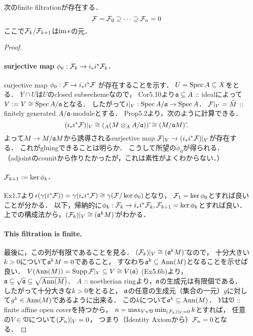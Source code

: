 \documentclass[a4paper]{jsarticle}
\newcommand{\coverV}{\mathfrak{V}}
\begin{document}
    \begin{Claim}
        次のfinite filtrationが存在する．
        \[ \mathcal{F}=\mathcal{F}_0 \supseteq \cdots \supseteq \mathcal{F}_n=0 \]
        ここで$\mathcal{F}_k/\mathcal{F}_{k+1}$は$\operatorname{im} \epsilon$の元．
    \end{Claim}
    \begin{proof}
        \paragraph{surjective map $\phi_k: \mathcal{F}_k \to i_* i^* \mathcal{F}_k$.}
        surjective map $\phi_0: \mathcal{F} \to i_* i^* \mathcal{F}$ が存在することを示す．
        $U=\operatorname{Spec} A \subseteq X$をとる．
        $Y \cap U$は$U$のclosed subsechemeなので，
        Cor5.10より$\mathfrak{a} \subseteq A$ :: idealによって
        $V:=V \cong \operatorname{Spec} A/\mathfrak{a}$となる．
        したがって$i|_{V}: \operatorname{Spec} A/\mathfrak{a} \to \operatorname{Spec} A$．
        $\mathcal{F}|_{V}=\tilde{M}$ :: finitely generated $A/\mathfrak{a}$-moduleとする．
        Prop5.2より，次のように計算できる．
        \[ (i_* i^* \mathcal{F})|_{V} \cong ({}_A(M \otimes_A A/\mathfrak{a}))\,\tilde{} \cong (M/\mathfrak{a}M) \,\tilde{}. \]
        よって$M \to M/\mathfrak{a}M$から誘導されるsurjective map
        $\mathcal{F}|_{V} \to (i_* i^* \mathcal{F})|_{V}$が存在する．
        これがgluingできることは明らか．
        こうして所望の$\phi_0$が得られる．
        （adjointのcounitから作りたかったが，これは素性がよくわからない．）

        \paragraph{$\mathcal{F}_{k+1}:=\ker \phi_k$.}
        Ex1.7より$\epsilon(\gamma(i^* \mathcal{F}))=\gamma(i_* i^* \mathcal{F}) \cong \gamma(\mathcal{F}/\ker \phi_0)$となり，
        $\mathcal{F}_1=\ker \phi_0$とすれば良いことが分かる．
        以下，帰納的に$\phi_k: \mathcal{F}_k \to i_* i^* \mathcal{F}_k, \mathcal{F}_{k+1}=\ker \phi_k$とすれば良い．
        上での構成法から，$(\mathcal{F}_{k})|_{V} \cong (\mathfrak{a}^{k} M)\,\tilde{}$がわかる．

        \paragraph{This filtration is finite.}
        最後に，この列が有限であることを見る．
        $(\mathcal{F}_{k})|_{V} \cong (\mathfrak{a}^{k} M)\,\tilde{}$なので，
        十分大きい$k>0$について$\mathfrak{a}^{k} M=0$であること，
        すなわち$\mathfrak{a}^k \subseteq \operatorname{Ann}(M)$となることを示せば良い．
        $V(\operatorname{Ann}(M))=\operatorname{Supp} \mathcal{F}|_{V} \subseteq V \cong V(\mathfrak{a})$ (Ex5.6b)より，
        $\mathfrak{a} \subseteq \sqrt{\mathfrak{a}} \subseteq \sqrt{\operatorname{Ann}(M)}$．
        $A$ :: noetherian ringより，$\mathfrak{a}$の生成元は有限個である．
        したがって十分大きな$k>0$をとると，
        $\mathfrak{a}$の任意の生成元（集合の一元）$g$に対して$g^k \in \operatorname{Ann}(M)$であるように出来る．
        この$k$について$\mathfrak{a}^k \subseteq \operatorname{Ann}(M)$．
        $Y$は$\coverV$ :: finite affine open coverを持つから，
        $n=\max_{V \in \coverV} \min_{(\shF_k)|_V=0} k$とすれば，
        任意の$V \in \coverV$について$(\mathcal{F}_n)|_V=0$，
        つまり（Identity Axiomから）$\mathcal{F}_n=0$となる．
    \end{proof}
\end{document}
